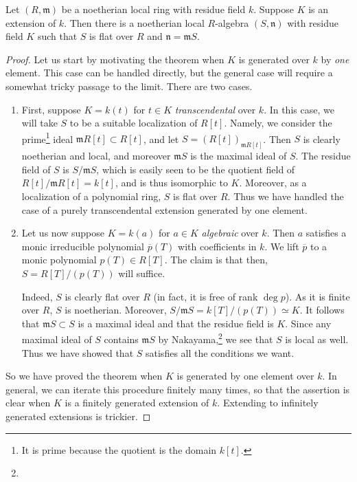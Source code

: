 \begin{theorem} 
Let $(R, \mathfrak{m})$ be a noetherian local ring with residue field $k$.
Suppose $K$ is an extension of $k$. Then there is a noetherian local
$R$-algebra $(S,
\mathfrak{n})$ with residue field $K$ such that $S$ is flat over $R$ and $\mathfrak{n} =
\mathfrak{m}S$.
\end{theorem} 

\begin{proof} 
Let us start by motivating the theorem when $K$ is generated over $k$ by
\emph{one} element. 
This case can be handled directly, but the general case will require a
somewhat tricky passage to the limit.
There are two cases.

\begin{enumerate}
\item  
First, suppose $K = k(t)$ for $t \in K$ \emph{transcendental} over $k$. In
this case, we will take $S$ to be a suitable localization of $R[t]$. Namely,
we consider the prime\footnote{It is prime because the quotient is the domain
$k[t]$.} ideal $\mathfrak{m} R[t] \subset R[t]$, and let
$S = (R[t])_{\mathfrak{m} R[t]}$. 
Then $S$ is clearly noetherian and local, and moreover $\mathfrak{m}S$ is the
maximal ideal of $S$. The residue field of $S$ is $S/\mathfrak{m}S $, which is
easily seen to be the quotient field of $R[t]/\mathfrak{m}R[t] = k[t]$, and is
thus isomorphic to $K$. Moreover, as a localization of a polynomial ring, $S$
is flat over $R$.
Thus we have handled the case of a purely transcendental extension generated
by one element.

\item 
Let us now suppose $K = k(a)$ for $a \in K$ \emph{algebraic} over $k$. Then
$a$ satisfies a monic irreducible polynomial $\overline{p}(T)$ with coefficients in $k$.
We lift $\overline{p}$ to a monic polynomial $p(T) \in R[T]$. The claim is
that then, $S = R[T]/(p(T))$ will suffice.

Indeed, $S$ is clearly flat over $R$ (in fact, it is free of rank $\deg p$).
As it is finite over $R$, $S$ is noetherian. Moreover, $S/\mathfrak{m}S = k[T]/
(p(T)) \simeq K$. It follows that $\mathfrak{m}S \subset S$ is a maximal ideal
and that the residue field is $K$. Since any maximal ideal of $S$ contains
$\mathfrak{m}S$ by Nakayama,\footnote{} we see that $S$
is local as well. Thus we have showed that $S$ satisfies all the conditions we
want.
\end{enumerate}

So we have proved the theorem when $K$ is generated by one element over $k$.
In general, we can iterate this procedure finitely many times, so that the
assertion is clear when $K$ is a finitely generated extension of $k$.
Extending to infinitely generated extensions is trickier.


\end{proof}
